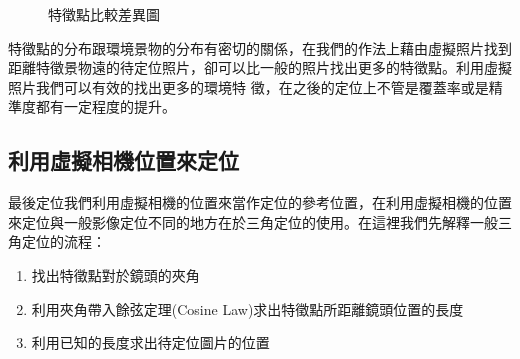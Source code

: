 	\begin{figure}
    	\begin{center}
    	\end{center}
    	\caption{特徵點比較差異圖 }
    	\label{fig:SIFT_Descriptor}
    \end{figure}
	
	特徵點的分布跟環境景物的分布有密切的關係，在我們的作法上藉由虛擬照片找到距離特徵景物遠的待定位照片，卻可以比一般的照片找出更多的特徵點。利用虛擬照片我們可以有效的找出更多的環境特
	徵，在之後的定位上不管是覆蓋率或是精準度都有一定程度的提升。

\subsection{利用虛擬相機位置來定位}

	最後定位我們利用虛擬相機的位置來當作定位的參考位置，在利用虛擬相機的位置來定位與一般影像定位不同的地方在於三角定位的使用。在這裡我們先解釋一般三角定位的流程：
	\begin{enumerate}
			\item 找出特徵點對於鏡頭的夾角
    		\item 利用夾角帶入餘弦定理(Cosine Law)求出特徵點所距離鏡頭位置的長度
    		\item 利用已知的長度求出待定位圖片的位置
	\end{enumerate}
	
